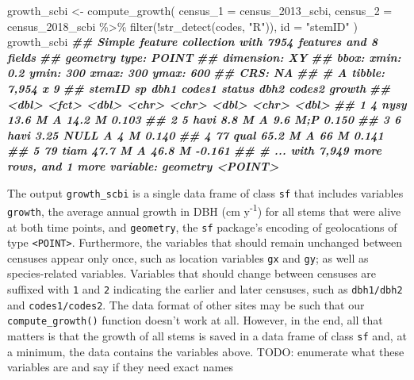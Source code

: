\documentclass[12pt]{article}
\newenvironment{Shaded}{\begin{snugshade}}{\end{snugshade}}
\newcommand{\AttributeTok}[1]{\textcolor[rgb]{0.77,0.63,0.00}{#1}}
\newcommand{\DocumentationTok}[1]{\textcolor[rgb]{0.56,0.35,0.01}{\textbf{\textit{#1}}}}
\newcommand{\FunctionTok}[1]{\textcolor[rgb]{0.00,0.00,0.00}{#1}}
\newcommand{\NormalTok}[1]{#1}
\newcommand{\OtherTok}[1]{\textcolor[rgb]{0.56,0.35,0.01}{#1}}
\newcommand{\SpecialCharTok}[1]{\textcolor[rgb]{0.00,0.00,0.00}{#1}}
\newcommand{\StringTok}[1]{\textcolor[rgb]{0.31,0.60,0.02}{#1}}
\begin{document}
\begin{Shaded}
\begin{Highlighting}[]
\NormalTok{growth\_scbi }\OtherTok{\textless{}{-}}
  \FunctionTok{compute\_growth}\NormalTok{(}
    \AttributeTok{census\_1 =}\NormalTok{ census\_2013\_scbi,}
    \AttributeTok{census\_2 =}\NormalTok{ census\_2018\_scbi }\SpecialCharTok{\%\textgreater{}\%} \FunctionTok{filter}\NormalTok{(}\SpecialCharTok{!}\FunctionTok{str\_detect}\NormalTok{(codes, }\StringTok{"R"}\NormalTok{)),}
    \AttributeTok{id =} \StringTok{"stemID"}
\NormalTok{  )}
\NormalTok{growth\_scbi}
\DocumentationTok{\#\# Simple feature collection with 7954 features and 8 fields}
\DocumentationTok{\#\# geometry type:  POINT}
\DocumentationTok{\#\# dimension:      XY}
\DocumentationTok{\#\# bbox:           xmin: 0.2 ymin: 300 xmax: 300 ymax: 600}
\DocumentationTok{\#\# CRS:            NA}
\DocumentationTok{\#\# \# A tibble: 7,954 x 9}
\DocumentationTok{\#\#   stemID sp     dbh1 codes1 status  dbh2 codes2 growth}
\DocumentationTok{\#\#    \textless{}dbl\textgreater{} \textless{}fct\textgreater{} \textless{}dbl\textgreater{} \textless{}chr\textgreater{}  \textless{}chr\textgreater{}  \textless{}dbl\textgreater{} \textless{}chr\textgreater{}   \textless{}dbl\textgreater{}}
\DocumentationTok{\#\# 1      4 nysy  13.6  M      A       14.2 M       0.103}
\DocumentationTok{\#\# 2      5 havi   8.8  M      A        9.6 M;P     0.150}
\DocumentationTok{\#\# 3      6 havi   3.25 NULL   A        4   M       0.140}
\DocumentationTok{\#\# 4     77 qual  65.2  M      A       66   M       0.141}
\DocumentationTok{\#\# 5     79 tiam  47.7  M      A       46.8 M      {-}0.161}
\DocumentationTok{\#\# \# ... with 7,949 more rows, and 1 more variable: geometry \textless{}POINT\textgreater{}}
\end{Highlighting}
\end{Shaded}

The output \texttt{growth\_scbi} is a single data frame of class
\texttt{sf} that includes variables \texttt{growth}, the average annual
growth in DBH (cm y\textsuperscript{-1}) for all stems that were alive
at both time points, and \texttt{geometry}, the \texttt{sf} package's
encoding of geolocations of type
\texttt{\textless{}POINT\textgreater{}}. Furthermore, the variables that
should remain unchanged between censuses appear only once, such as
location variables \texttt{gx} and \texttt{gy}; as well as
species-related variables. Variables that should change between censuses
are suffixed with \texttt{1} and \texttt{2} indicating the earlier and
later censuses, such as \texttt{dbh1/dbh2} and \texttt{codes1/codes2}.
The data format of other sites may be such that our
\texttt{compute\_growth()} function doesn't work at all. However, in the
end, all that matters is that the growth of all stems is saved in a data
frame of class \texttt{sf} and, at a minimum, the data contains the
variables above. TODO: enumerate what these variables are and say if
they need exact names
\end{document}
